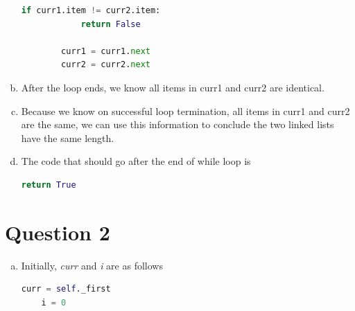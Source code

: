 \documentclass[12pt]{article}
\begin{document}
\begin{enumerate}[a.]
\begin{lstlisting}[language=Python]
        if curr1.item != curr2.item:
            return False

        curr1 = curr1.next
        curr2 = curr2.next
    \end{lstlisting}

    \item

    After the loop ends, we know all items in curr1 and curr2 are identical.

    \item

    Because we know on successful loop termination, all items in curr1 and curr2
    are the same, we can use this information to conclude the two linked lists
    have the same length.

    \item

    The code that should go after the end of while loop is

    \begin{lstlisting}[language=Python]
    return True
    \end{lstlisting}

\end{enumerate}

\section*{Question 2}
\begin{enumerate}[a.]
    \item

    Initially, \textit{curr} and \textit{i} are as follows

    \bigskip

    \begin{lstlisting}[language=Python]
    curr = self._first
    i = 0
    \end{lstlisting}

\end{enumerate}
\end{document}
